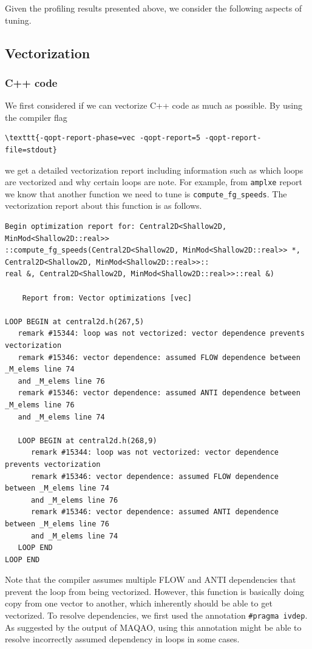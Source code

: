 \documentclass[12pt]{article}
\numberwithin{equation}{section}
\begin{document}
\normalsize
Given the profiling results presented above, we consider the following aspects of tuning.

\subsection{Vectorization}

\subsubsection{C++ code}

We first considered if we can vectorize C++ code as much as possible. By using the compiler flag

\scriptsize
\begin{lstlisting}
\texttt{-qopt-report-phase=vec -qopt-report=5 -qopt-report-file=stdout}
\end{lstlisting}
\normalsize
we get a detailed vectorization report including information such as which loops are vectorized and why certain loops are note. For example, from \texttt{amplxe} report we know that another function we need to tune is \texttt{compute\_fg\_speeds}.
The vectorization report about this function is as follows.

\scriptsize
\begin{lstlisting}
Begin optimization report for: Central2D<Shallow2D, MinMod<Shallow2D::real>>
::compute_fg_speeds(Central2D<Shallow2D, MinMod<Shallow2D::real>> *,
Central2D<Shallow2D, MinMod<Shallow2D::real>>::
real &, Central2D<Shallow2D, MinMod<Shallow2D::real>>::real &)

    Report from: Vector optimizations [vec]

LOOP BEGIN at central2d.h(267,5)
   remark #15344: loop was not vectorized: vector dependence prevents vectorization
   remark #15346: vector dependence: assumed FLOW dependence between _M_elems line 74
   and _M_elems line 76
   remark #15346: vector dependence: assumed ANTI dependence between _M_elems line 76
   and _M_elems line 74

   LOOP BEGIN at central2d.h(268,9)
      remark #15344: loop was not vectorized: vector dependence prevents vectorization
      remark #15346: vector dependence: assumed FLOW dependence between _M_elems line 74
      and _M_elems line 76
      remark #15346: vector dependence: assumed ANTI dependence between _M_elems line 76
      and _M_elems line 74
   LOOP END
LOOP END
\end{lstlisting}
\normalsize
Note that the compiler assumes multiple FLOW and ANTI dependencies that prevent the
loop from being vectorized. However, this function is basically doing copy from one
vector to another, which inherently should be able to get vectorized.
To resolve dependencies, we first used the annotation \texttt{\#pragma ivdep}.
As suggested by the output of MAQAO, using this annotation might be able to
resolve incorrectly assumed dependency in loops in some cases.
\end{document}
